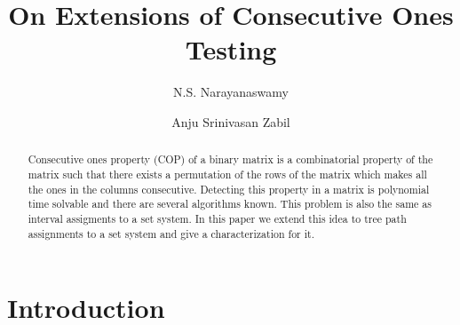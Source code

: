 \documentclass{llncs}
\begin{document}
\title{On Extensions of Consecutive Ones Testing}

\author{N.S. Narayanaswamy  \and Anju Srinivasan Zabil }



\date{}

\maketitle

\begin{abstract}
  Consecutive ones property (COP) of a binary matrix is a
  combinatorial property of the matrix such that there exists a
  permutation of the rows of the matrix which makes all the ones in
  the columns consecutive. Detecting this property in a matrix is
  polynomial time solvable and there are several algorithms
  known. This problem is also the same as interval assigments to a set
  system. In this paper we extend this idea to tree path assignments
  to a set system and give a characterization for it.
\end{abstract}

\section{Introduction}
\end{document}
